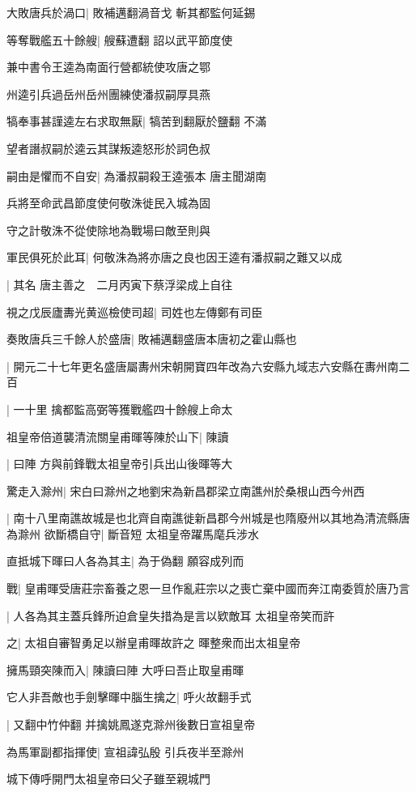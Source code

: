 大敗唐兵於渦口|{
	敗補邁翻渦音戈}
斬其都監何延錫

等奪戰艦五十餘艘|{
	艘蘇遭翻}
詔以武平節度使

兼中書令王逵為南面行營都統使攻唐之鄂

州逵引兵過岳州岳州團練使潘叔嗣厚具燕

犒奉事甚謹逵左右求取無厭|{
	犒苦到翻厭於鹽翻}
不滿

望者譖叔嗣於逵云其謀叛逵怒形於詞色叔

嗣由是懼而不自安|{
	為潘叔嗣殺王逵張本}
唐主聞湖南

兵將至命武昌節度使何敬洙徙民入城為固

守之計敬洙不從使除地為戰場曰敵至則與

軍民俱死於此耳|{
	何敬洙為將亦唐之良也因王逵有潘叔嗣之難又以成}


|{
	其名}
唐主善之　二月丙寅下蔡浮梁成上自往

視之戊辰廬夀光黄巡檢使司超|{
	司姓也左傳鄭有司臣}


奏敗唐兵三千餘人於盛唐|{
	敗補邁翻盛唐本唐初之霍山縣也}


|{
	開元二十七年更名盛唐屬夀州宋朝開寶四年改為六安縣九域志六安縣在夀州南二百}


|{
	一十里}
擒都監高弼等獲戰艦四十餘艘上命太

祖皇帝倍道襲清流關皇甫暉等陳於山下|{
	陳讀}


|{
	曰陣}
方與前鋒戰太祖皇帝引兵出山後暉等大

驚走入滁州|{
	宋白曰滁州之地劉宋為新昌郡梁立南譙州於桑根山西今州西}


|{
	南十八里南譙故城是也北齊自南譙徙新昌郡今州城是也隋廢州以其地為清流縣唐為滁州}
欲斷橋自守|{
	斷音短}
太祖皇帝躍馬麾兵涉水

直抵城下暉曰人各為其主|{
	為于偽翻}
願容成列而

戰|{
	皇甫暉受唐莊宗畜養之恩一旦作亂莊宗以之喪亡棄中國而奔江南委質於唐乃言}


|{
	人各為其主蓋兵鋒所迫倉皇失措為是言以欵敵耳}
太祖皇帝笑而許

之|{
	太祖自審智勇足以辦皇甫暉故許之}
暉整衆而出太祖皇帝

擁馬頸突陳而入|{
	陳讀曰陣}
大呼曰吾止取皇甫暉

它人非吾敵也手劍擊暉中腦生擒之|{
	呼火故翻手式}


|{
	又翻中竹仲翻}
并擒姚鳳遂克滁州後數日宣祖皇帝

為馬軍副都指揮使|{
	宣祖諱弘殷}
引兵夜半至滁州

城下傳呼開門太祖皇帝曰父子雖至親城門

